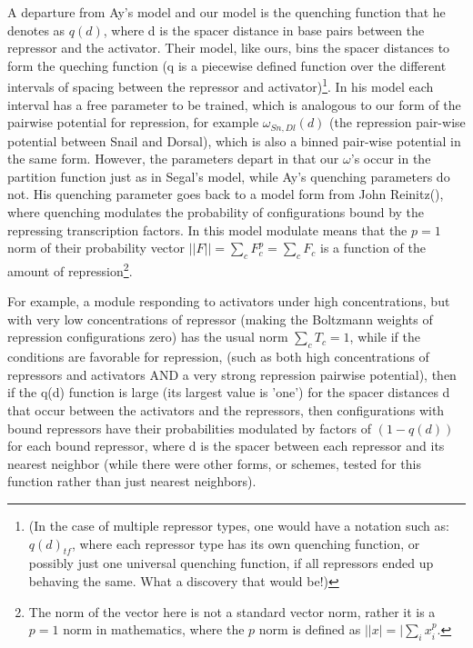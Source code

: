 A departure from Ay's model and our model is the quenching function that he denotes as $q(d)$, where d is the spacer distance in base pairs between the repressor and the activator.  Their model, like ours, bins the spacer distances to form the queching function (q is a piecewise defined function over the different intervals of spacing between the repressor and activator)\footnote{  (In the case of multiple repressor types, one would have a notation such as: $q(d)_{tf}$, where each repressor type has its own quenching function, or possibly just one universal quenching function, if all repressors ended up behaving the same.  What a discovery that would be!) }.  In his model each interval has a free parameter to be trained, which is analogous to our form of the pairwise potential for repression, for example $\omega_{Sn,Dl}(d)$ (the repression pair-wise potential between Snail and Dorsal), which is also a binned pair-wise potential in the same form.  However, the parameters depart in that our $\omega$'s occur in the partition function just as in Segal's model, while Ay's quenching parameters do not.  His quenching parameter goes back to a model form from John Reinitz(\cite{perplexus}), where quenching modulates the probability of configurations bound by the repressing transcription factors.  In this model modulate means that the $p=1$ norm of their probability vector $ ||F|| = \sum_c F_c^{p}=\sum_c F_c$ is a function of the amount of repression\footnote{The norm of the vector here is not a standard vector norm, rather it is a $p=1$ norm in mathematics, where the $p$ norm is defined as $||x|=|\sum_i x_i^{p}$. }. 

 For example, a module responding to activators under high concentrations, but with very low concentrations of repressor (making the Boltzmann weights of repression configurations zero) has the usual norm $\sum_c T_c=1$, while if the conditions are favorable for repression, (such as both high concentrations of repressors and activators AND a very strong repression pairwise potential), then if the q(d) function is large (its largest value is 'one') for the spacer distances d that occur between the activators and the repressors, then configurations with bound repressors have their probabilities modulated by factors of $(1-q(d))$ for each bound repressor, where d is the spacer between each repressor and its nearest neighbor (while there were other forms, or schemes, tested for this function rather than just nearest neighbors).  
 
